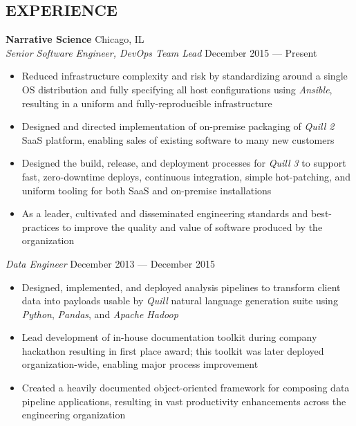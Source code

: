 \documentclass[line,margin]{res}
\begin{document}
\address{wilsoniya@gmail.com}
\address{(312) 404--0425}

\begin{resume}



\section{EXPERIENCE}
    \textbf{Narrative Science} \hfill Chicago, IL \\
    \textit{Senior Software Engineer, DevOps Team Lead}
    \hfill December 2015 --- Present
        \begin{itemize}  \itemsep -2pt
            \item Reduced infrastructure complexity and risk by standardizing
                around a single OS distribution and fully specifying all host
                configurations using \textit{Ansible}, resulting in a uniform
                and fully-reproducible infrastructure
            \item Designed and directed implementation of on-premise packaging
                of \textit{Quill 2} SaaS platform, enabling sales of existing
                software to many new customers
            \item Designed the build, release, and deployment processes for
                \textit{Quill 3} to support fast, zero-downtime deploys,
                continuous integration, simple hot-patching, and uniform
                tooling for both SaaS and on-premise installations
            \item As a leader, cultivated and disseminated engineering
                standards and best-practices to improve the quality and value
                of  software produced by the organization
        \end{itemize}
     \textit{Data Engineer} \hfill December 2013 --- December 2015
        \begin{itemize} \itemsep -2pt
            \item Designed, implemented, and deployed     analysis pipelines to
                transform client data into payloads usable by \textit{Quill}
                natural language generation suite using \textit{Python},
                \textit{Pandas}, and \textit{Apache Hadoop}
            \item Lead development of in-house documentation toolkit during
                company hackathon resulting in first place award; this toolkit
                was later deployed organization-wide, enabling major process
                improvement
            \item Created a heavily documented object-oriented framework for
                composing data pipeline applications, resulting in vast
                productivity enhancements across the engineering organization
        \end{itemize}


\end{resume}
\end{document}
